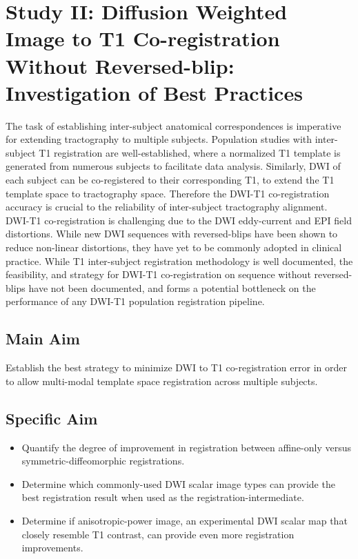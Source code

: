 \section{Study II: Diffusion Weighted Image to T1 Co-registration Without Reversed-blip: Investigation of Best Practices}
The task of establishing inter-subject anatomical correspondences is imperative for extending tractography to multiple subjects. Population studies with inter-subject T1 registration are well-established, where a normalized T1 template is generated from numerous subjects to facilitate data analysis. Similarly, DWI of each subject can be co-registered to their corresponding T1, to extend the T1 template space to tractography space. Therefore the DWI-T1 co-registration accuracy is crucial to the reliability of inter-subject tractography alignment. DWI-T1 co-registration is challenging due to the DWI eddy-current and EPI field distortions. While new DWI sequences with reversed-blips have been shown to reduce non-linear distortions, they have yet to be commonly adopted in clinical practice. While T1 inter-subject registration methodology is well documented, the feasibility, and strategy for DWI-T1 co-registration on sequence without reversed-blips have not been documented, and forms a potential bottleneck on the performance of any DWI-T1 population registration pipeline.

\subsection{Main Aim}
Establish the best strategy to minimize DWI to T1 co-registration error in order to allow multi-modal template space registration across multiple subjects.

\subsection{Specific Aim}
\begin{itemize}
    \item Quantify the degree of improvement in registration between affine-only versus symmetric-diffeomorphic registrations.
    \item Determine which commonly-used DWI scalar image types can provide the best registration result when used as the registration-intermediate.
    \item Determine if anisotropic-power image, an experimental DWI scalar map that closely resemble T1 contrast, can provide even more registration improvements. 
\end{itemize}

